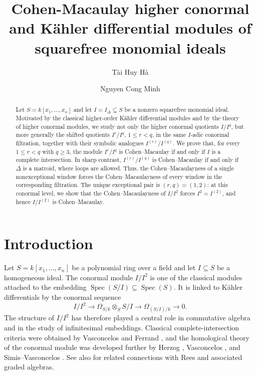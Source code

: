 \documentclass[12pt]{amsart}
\title[Cohen--Macaulay power quotients]{Cohen-Macaulay higher conormal and K\"ahler differential modules of squarefree monomial ideals}
\author{T\`ai Huy H\`a}
\author{Nguyen Cong Minh}
\theoremstyle{plain}
\theoremstyle{definition}
\theoremstyle{remark}
\begin{document}
\begin{abstract}
Let $S=k[x_1,\ldots,x_n]$ and let $I=I_\Delta\subsetneq S$ be a nonzero
squarefree monomial ideal. Motivated by the classical higher-order K\"ahler
differential modules and by the theory of higher conormal modules, we study
not only the higher conormal quotients $I/I^q$, but more generally the shifted
quotients $I^r/I^q$, $1\le r<q$, in the same $I$-adic conormal filtration,
together with their symbolic analogues $I^{(r)}/I^{(q)}$. We prove that, for
every $1\le r<q$ with $q\ge3$, the module $I^r/I^q$ is Cohen--Macaulay if and
only if $I$ is a complete intersection. In sharp contrast,
$I^{(r)}/I^{(q)}$ is Cohen--Macaulay if and only if $\Delta$ is a matroid,
where loops are allowed. Thus, the Cohen--Macaulayness of a single nonexceptional
window forces the Cohen--Macaulayness of every window in the corresponding
filtration. The unique exceptional pair is $(r,q)=(1,2)$: at this conormal
level, we show that the Cohen--Macaulayness of $I/I^2$ forces $I^2=I^{(2)}$, and
hence $I/I^{(2)}$ is Cohen--Macaulay.
\end{abstract}

\maketitle

\section{Introduction}\label{sec:introduction}

Let $S=k[x_1,\ldots,x_n]$ be a polynomial ring over a field and let
$I\subseteq S$ be a homogeneous ideal. The conormal module $I/I^2$ is one of
the classical modules attached to the embedding $\operatorname{Spec}(S/I)
\subseteq \operatorname{Spec}(S)$. It is linked to K\"ahler differentials by
the conormal sequence
$$
I/I^2\longrightarrow \Omega_{S/k}\otimes_S S/I
\longrightarrow \Omega_{(S/I)/k}\longrightarrow0.
$$
The structure of $I/I^2$ has therefore played a central role in commutative
algebra and in the study of infinitesimal embeddings. Classical
complete-intersection criteria were obtained by Vasconcelos
\cite{VasconcelosRSequences} and Ferrand \cite{Ferrand}, and the homological
theory of the conormal module was developed further by Herzog
\cite{HerzogConormal}, Vasconcelos
\cite{VasconcelosHomology,VasconcelosKoszul}, and Simis--Vasconcelos
\cite{SimisVasconcelos}. See also
\cite{HeinzerKimUlrich,HunekeUlrich,VasconcelosBook} for related connections
with Rees and associated graded algebras.
\end{document}
